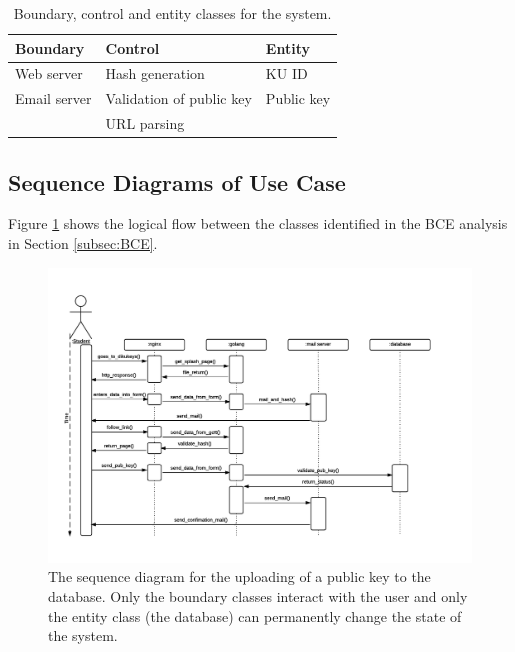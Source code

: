\documentclass[11pt,a4paper]{report}
\begin{document}
\begin{center}
\begin{table}[h]
\centering
\begin{tabular}{|l|l|l|}
\hline
\textbf{Boundary}     & \textbf{Control}                  & \textbf{Entity}     \\ \hline
Web server   & Hash generation          & KU ID      \\
Email server & Validation of public key & Public key \\
             & URL parsing              &            \\ \hline
\end{tabular}
\caption{Boundary, control and entity classes for the system.}
\end{table}
\end{center}




\subsection{Sequence Diagrams of Use Case}\label{subsec:Sequence_diagram_Use_case_model}
Figure \ref{fig:sequence_diagram} shows the logical flow between the classes identified in the BCE analysis in Section \ref{subsec:BCE}.
\begin{figure}[H]
    \centering
    \includegraphics[width=\textwidth]{pictures/sequence_diagram_upload_key}
    \caption{The sequence diagram for the uploading of a public key to the database. Only the boundary classes interact with the user and only the entity class (the database) can permanently change the state of the system.}
    \label{fig:sequence_diagram}
\end{figure}
\end{document}
